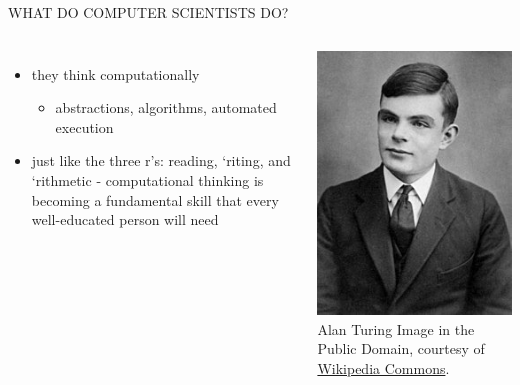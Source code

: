 \documentclass[aspectratio=169]{beamer}
\begin{document}
\begin{frame}{WHAT DO COMPUTER SCIENTISTS DO?}
\begin{columns}
\begin{itemize}
\item they think computationally
\begin{itemize}
\item abstractions, algorithms, automated execution
\end{itemize}
\item just like the three r’s: reading, ‘riting, and ‘rithmetic -
computational thinking is becoming a fundamental skill that
every well-educated person will need
\end{itemize}


\begin{columns}
\includegraphics[scale=0.34]{graphics/alan_turing.jpg}
\tiny{Alan Turing
Image in the Public Domain, courtesy of \href{https://es.wikipedia.org/wiki/Alan_Turing}{Wikipedia Commons}.}

\end{columns}
\end{columns}
\end{frame}
\end{document}
